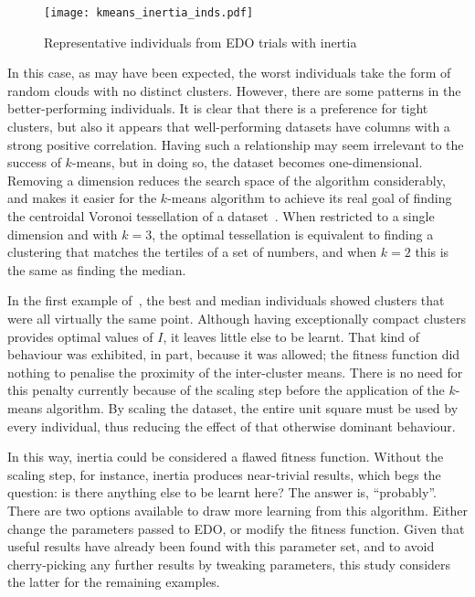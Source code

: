 \begin{figure}
    \centering
    \texttt{[image: kmeans\_inertia\_inds.pdf]}
    \caption{%
        Representative individuals from EDO trials with inertia
    }\label{fig:kmeans_inertia_inds}
\end{figure}

In this case, as may have been expected, the worst individuals take the form of
random clouds with no distinct clusters. However, there are some patterns in the
better-performing individuals. It is clear that there is a preference for tight
clusters, but also it appears that well-performing datasets have columns with a
strong positive correlation. Having such a relationship may seem irrelevant to
the success of \(k\)-means, but in doing so, the dataset becomes
one-dimensional. Removing a dimension reduces the search space of the algorithm
considerably, and makes it easier for the \(k\)-means algorithm to achieve its
real goal of finding the centroidal Voronoi tessellation of a
dataset~\cite{Du2006}. When restricted to a single dimension and with \(k = 3\),
the optimal tessellation is equivalent to finding a clustering that matches the
tertiles of a set of numbers, and when \(k = 2\) this is the same as finding the
median.


In the first example of~\cite{Wilde2020:edo}, the best and median individuals
showed clusters that were all virtually the same point. Although having
exceptionally compact clusters provides optimal values of \(I\), it leaves
little else to be learnt. That kind of behaviour was exhibited, in part, because
it was allowed; the fitness function did nothing to penalise the proximity of
the inter-cluster means. There is no need for this penalty currently because of
the scaling step before the application of the \(k\)-means algorithm. By scaling
the dataset, the entire unit square must be used by every individual, thus
reducing the effect of that otherwise dominant behaviour.

In this way, inertia could be considered a flawed fitness function. Without the
scaling step, for instance, inertia produces near-trivial results, which begs
the question: is there anything else to be learnt here? The answer is,
``probably''. There are two options available to draw more learning from this
algorithm. Either change the parameters passed to EDO, or modify the fitness
function. Given that useful results have already been found with this parameter
set, and to avoid cherry-picking any further results by tweaking parameters,
this study considers the latter for the remaining examples.


